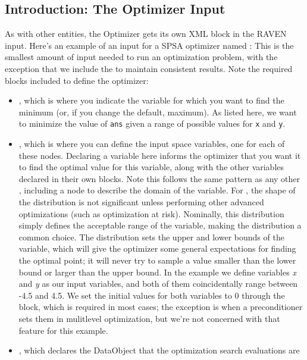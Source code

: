 \subsection{Introduction: The Optimizer Input}
As with other entities, the Optimizer gets its own XML block in the RAVEN input.
Here's an example of an input for a SPSA optimizer named :
This is the smallest amount of input needed to run an optimization problem, with the exception that we include
the  to maintain consistent results.  Note the required blocks included
to define the optimizer:
\begin{itemize}
  \item {}, which is where you indicate the variable for which you want to find the minimum (or,
    if you change the default, maximum).  As listed here, we want to minimize the value of \texttt{ans} given a
    range of possible values for \texttt{x} and \texttt{y}.
  \item {}, which is where you can define the input space variables, one for each of these
    nodes.  Declaring a variable here informs the optimizer that you want it to find the optimal value for
    this variable, along with the other variables declared in their own blocks. Note this follows
    the same pattern as any other , including a  node to
    describe the domain of the variable. For , the shape of the
    distribution is not significant unless performing other advanced optimizations (such as
    optimization at risk). Nominally, this distribution simply defines the acceptable range of the
    variable, making the  distribution a common choice. The distribution sets the
    upper and lower bounds of the variable, which will give the optimizer some general expectations for
    finding the optimal point; it will never try to sample a value smaller than the lower bound or larger than
    the upper bound.  In the example we define variables \emph{x} and \emph{y} as our input variables, and
    both of them coincidentally range between -4.5 and 4.5.  We set the initial values for both variables to 0
    through the  block, which is required in most cases; the exception is when a
    preconditioner sets them in mulitlevel optimization, but we're not concerned with that feature
    for this example.
  \item {}, which declares the DataObject that the optimization search evaluations are

\end{itemize}
